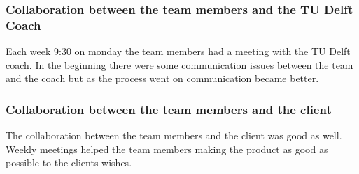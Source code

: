 \subsubsection{Collaboration between the team members and the TU Delft Coach}
Each week 9:30 on monday the team members had a meeting with the TU Delft coach. In the beginning there were some communication issues between the team and the coach but as the process went on communication became better.

\subsubsection{Collaboration between the team members and the client}
The collaboration between the team members and the client was good as well. 
Weekly meetings helped the team members making the product as good as possible to the clients wishes. 